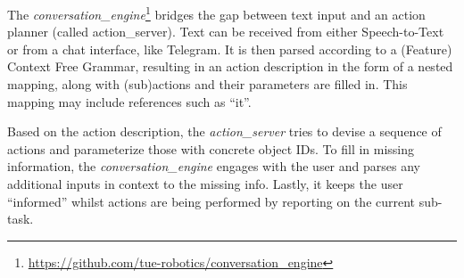 \label{ssec:conversation}
\noindent The \emph{conversation\_engine}\footnote{\url{https://github.com/tue-robotics/conversation_engine}} bridges the gap between text input and an action planner (called action\_server). Text can be received from either Speech-to-Text or from a chat interface, like Telegram\texttrademark\hspace{0em}. It is then parsed according to a (Feature) Context Free Grammar, resulting in an action description in the form of a nested mapping, along with (sub)actions and their parameters are filled in.
This mapping may include references such as “it”.

Based on the action description, the \emph{action\_server} tries to devise a sequence of actions and parameterize those with concrete object IDs.
To fill in missing information, the \emph{conversation\_engine} engages with the user and parses any additional inputs in context to the missing info. %
Lastly, it keeps the user “informed” whilst actions are being performed by reporting on the current sub-task.
